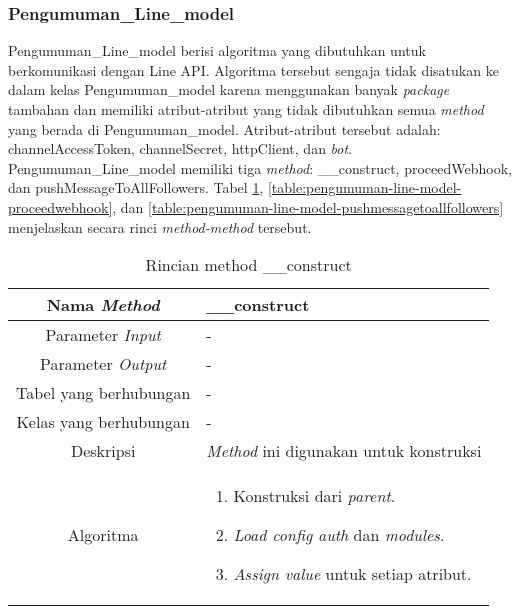 \subsubsection{Pengumuman\_Line\_model}
Pengumuman\_Line\_model berisi algoritma yang dibutuhkan untuk berkomunikasi dengan Line API. Algoritma tersebut sengaja tidak disatukan ke dalam kelas Pengumuman\_model karena menggunakan banyak \textit{package} tambahan dan memiliki atribut-atribut yang tidak dibutuhkan semua \textit{method} yang berada di Pengumuman\_model. Atribut-atribut tersebut adalah: \textdollar channelAccessToken, \textdollar channelSecret, \textdollar httpClient, dan \textdollar \textit{bot}. Pengumuman\_Line\_model memiliki tiga \textit{method}: \_\_construct, proceedWebhook, dan pushMessageToAllFollowers. Tabel \ref{table:pengumuman-line-model-construct}, \ref{table:pengumuman-line-model-proceedwebhook}, dan \ref{table:pengumuman-line-model-pushmessagetoallfollowers} menjelaskan secara rinci \textit{method-method} tersebut.

\begin{center}
	\begin{table}[H]
	\caption{Rincian method \_\_construct}
	\label{table:pengumuman-line-model-construct}
\begin{tabular}{|c|p{11cm}|}
\hline
Nama \textit{Method} 	& 	 	\_\_construct \\
\hline
Parameter \textit{Input} & - \\
\hline
Parameter \textit{Output} & - \\
\hline
Tabel yang berhubungan & -\\
\hline
Kelas yang berhubungan &  - \\
\hline
Deskripsi	& \textit{Method} ini digunakan untuk konstruksi\\
\hline
Algoritma	& \begin{enumerate}
				\item Konstruksi dari \textit{parent}.
				\item \textit{Load config auth} dan \textit{modules}.
				\item \textit{Assign value} untuk setiap atribut.
				\end{enumerate} \\
\hline
\end{tabular}
\end{table}
\end{center}

